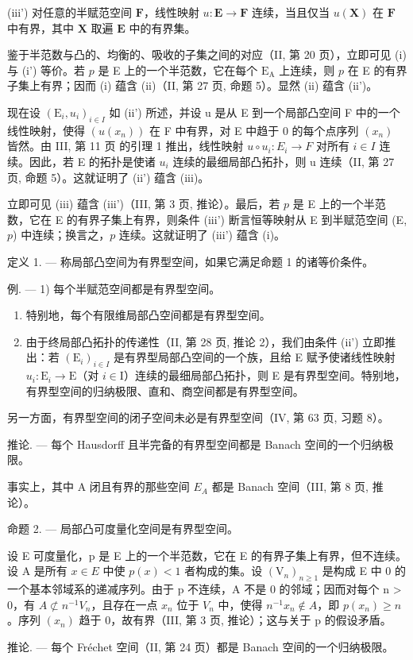 (iii') 对任意的半赋范空间 \(\mathbf{F}\)，线性映射 \(u: \mathbf{E} \to \mathbf{F}\) 连续，当且仅当 \(u(\mathbf{X})\) 在 \(\mathbf{F}\) 中有界，其中 \(\mathbf{X}\) 取遍 \(\mathbf{E}\) 中的有界集。

鉴于半范数与凸的、均衡的、吸收的子集之间的对应（II, 第 20 页），立即可见 (i) 与 (i') 等价。若 \(p\) 是 E 上的一个半范数，它在每个 \(\mathrm{E}_{\mathrm{A}}\) 上连续，则 \(p\) 在 E 的有界子集上有界；因而 (i) 蕴含 (ii)（II, 第 27 页, 命题 5）。显然 (ii) 蕴含 (ii')。

现在设 \((\mathrm{E}_{i}, u_{i})_{i\in I}\) 如 (ii') 所述，并设 u 是从 E 到一个局部凸空间 F 中的一个线性映射，使得 \((u(x_{n}))\) 在 F 中有界，对 E 中趋于 0 的每个点序列 \((x_{n})\) 皆然。由 III, 第 11 页 的引理 1 推出，线性映射 \(u\circ u_{i}:E_{i}\to F\) 对所有 \(i\in I\) 连续。因此，若 E 的拓扑是使诸 \(u_{i}\) 连续的最细局部凸拓扑，则 u 连续（II, 第 27 页, 命题 5）。这就证明了 (ii') 蕴含 (iii)。

立即可见 (iii) 蕴含 (iii')（III, 第 3 页, 推论）。最后，若 \(p\) 是 E 上的一个半范数，它在 E 的有界子集上有界，则条件 (iii') 断言恒等映射从 E 到半赋范空间 (E, \(p\)) 中连续；换言之，\(p\) 连续。这就证明了 (iii') 蕴含 (i)。

定义 1. --- 称局部凸空间为有界型空间，如果它满足命题 1 的诸等价条件。

例. --- 1) 每个半赋范空间都是有界型空间。

\begin{enumerate}
\def\labelenumi{\arabic{enumi})}
\setcounter{enumi}{1}
\item
  特别地，每个有限维局部凸空间都是有界型空间。
\item
  由于终局部凸拓扑的传递性（II, 第 28 页, 推论 2），我们由条件 (ii') 立即推出：若 \((\mathrm{E}_i)_{i\in I}\) 是有界型局部凸空间的一个族，且给 E 赋予使诸线性映射 \(u_{i}:\mathrm{E}_{i}\to \mathrm{E}\)（对 \(i\in \mathrm{I}\)）连续的最细局部凸拓扑，则 E 是有界型空间。特别地，有界型空间的归纳极限、直和、商空间都是有界型空间。
\end{enumerate}

另一方面，有界型空间的闭子空间未必是有界型空间（IV, 第 63 页, 习题 8）。

推论. --- 每个 Hausdorff 且半完备的有界型空间都是 Banach 空间的一个归纳极限。

事实上，其中 A 闭且有界的那些空间 \(E_{A}\) 都是 Banach 空间（III, 第 8 页, 推论）。

命题 2. --- 局部凸可度量化空间是有界型空间。

设 E 可度量化，p 是 E 上的一个半范数，它在 E 的有界子集上有界，但不连续。设 A 是所有 \(x \in E\) 中使 \(p(x) < 1\) 者构成的集。设 \((\mathrm{V}_{n})_{n \geqslant 1}\) 是构成 E 中 0 的一个基本邻域系的递减序列。由于 p 不连续，A 不是 0 的邻域；因而对每个 n \textgreater{} 0，有 \(A \not\subset n^{-1}V_{n}\)，且存在一点 \(x_{n}\) 位于 \(V_{n}\) 中，使得 \(n^{-1}x_{n} \notin A\)，即 \(p(x_{n}) \geqslant n\)。序列 \((x_{n})\) 趋于 0，故有界（III, 第 3 页, 推论）；这与关于 p 的假设矛盾。

推论. --- 每个 Fréchet 空间（II, 第 24 页）都是 Banach 空间的一个归纳极限。

